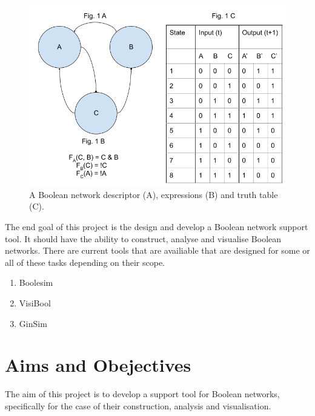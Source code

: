 \documentclass[12pt, letterpaper]{article}
\begin{document}
    \begin{figure}[H]
      \begin{center}
        \includegraphics[scale=0.5]{Fig1.png}
      \end{center}
      \caption{A Boolean network descriptor (A), expressions (B) and truth table (C).}
      \label{fig:BoolNet}
    \end{figure}

    The end goal of this project is the design and develop a Boolean network support tool. It should 
    have the ability to construct, analyse and visualise Boolean networks. There are current tools
    that are availiable that are designed for some or all of these tasks depending on their scope.
    \begin{enumerate}[noitemsep]
      \item Boolesim \cite{Boolesim}
      \item VisiBool \cite{Visibool}
      \item GinSim \cite{Ginsim}
    \end{enumerate}

  \newpage

  \section{Aims and Obejectives}

    The aim of this project is to develop a support tool for Boolean networks, 
    specifically for the case of their construction, analysis and visualisation.
\end{document}

